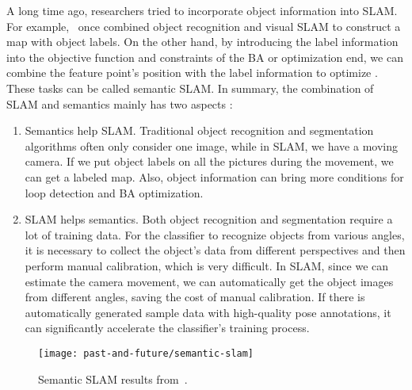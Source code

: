 A long time ago, researchers tried to incorporate object information into SLAM. For example,~\cite{Nuechter2008, Civera2011, Koppula2011, Anand2012} once combined object recognition and visual SLAM to construct a map with object labels. On the other hand, by introducing the label information into the objective function and constraints of the BA or optimization end, we can combine the feature point's position with the label information to optimize {\cite{Fioraio2013}}. These tasks can be called semantic SLAM. In summary, the combination of SLAM and semantics mainly has two aspects {\cite{Cadena2016}}:

\begin{enumerate}
	\item Semantics help SLAM. Traditional object recognition and segmentation algorithms often only consider one image, while in SLAM, we have a moving camera. If we put object labels on all the pictures during the movement, we can get a labeled map. Also, object information can bring more conditions for loop detection and BA optimization.
	\item SLAM helps semantics. Both object recognition and segmentation require a lot of training data. For the classifier to recognize objects from various angles, it is necessary to collect the object's data from different perspectives and then perform manual calibration, which is very difficult. In SLAM, since we can estimate the camera movement, we can automatically get the object images from different angles, saving the cost of manual calibration. If there is automatically generated sample data with high-quality pose annotations, it can significantly accelerate the classifier's training process.
\end{enumerate}

\begin{figure}[!thp]
	\centering
	\texttt{[image: past-and-future/semantic-slam]}
	\caption{Semantic SLAM results from~\cite{Anand2012, Salas-Moreno2014}.}
	\label{fig:semantic-slam}
\end{figure}

